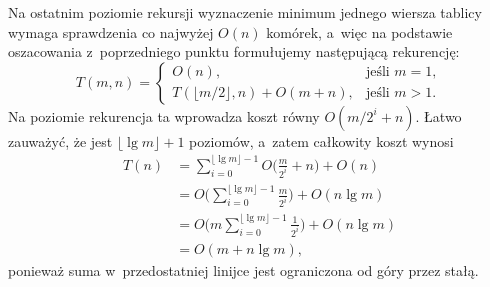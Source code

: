 \subproblem %
Na ostatnim poziomie rekursji wyznaczenie minimum jednego wiersza tablicy wymaga sprawdzenia co najwyżej $O(n)$ komórek, a~więc na podstawie oszacowania z~poprzedniego punktu formułujemy następującą rekurencję:
\[
	T(m,n) =
	\begin{cases}
		O(n), & \text{jeśli $m=1$}, \\
		T(\lfloor m/2\rfloor,n)+O(m+n), & \text{jeśli $m>1$}.
	\end{cases}
\]
Na  poziomie rekurencja ta wprowadza koszt równy $O(m/2^i+n)$. Łatwo zauważyć, że jest $\lfloor\lg m\rfloor+1$ poziomów, a~zatem całkowity koszt wynosi
\begin{align*}
	T(n) &= \sum_{i=0}^{\lfloor\lg m\rfloor-1}O\biggl(\frac{m}{2^i}+n\biggr)+O(n) \\
	&= O\biggl(\sum_{i=0}^{\lfloor\lg m\rfloor-1}\frac{m}{2^i}\biggr)+O(n\lg m) \\
	&= O\biggl(m\sum_{i=0}^{\lfloor\lg m\rfloor-1}\frac{1}{2^i}\biggr)+O(n\lg m) \\[1mm]
	&= O(m+n\lg m),
\end{align*}
ponieważ suma w~przedostatniej linijce jest ograniczona od góry przez stałą.

\endinput
